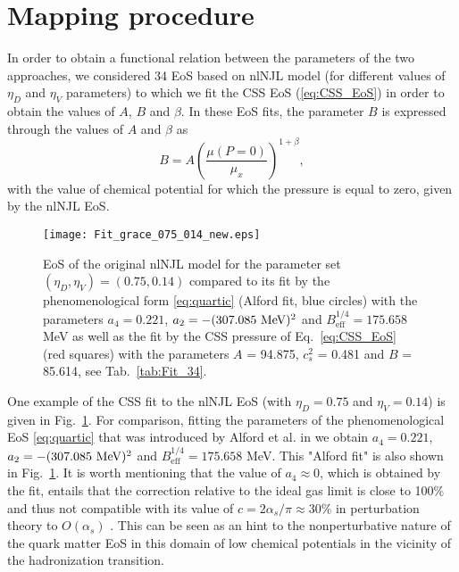 \documentclass[%
 reprint,
superscriptaddress,
nofootinbib,
 amsmath,amssymb,
 aps,
]{revtex4-1}
\begin{document}
\appendix
\section{Mapping procedure}
\label{app:CSS-map}

In order to obtain a functional relation between the parameters of the two approaches, we considered 34 EoS based on nlNJL model (for different values of $\eta_D$ and $\eta_V$ parameters) to which we fit the CSS EoS (\ref{eq:CSS_EoS}) in order to obtain the values of $A$, $B$ and $\beta$. In these EoS fits, the parameter $B$ is expressed through the values of $A$ and $\beta$ as  
\begin{equation}
    B = A \left( \frac{\mu(P=0)}{\mu_x}\right)^{1+\beta},
\end{equation}
with the value of chemical potential for which the pressure is equal to zero, given by the nlNJL EoS.

\begin{figure}[b!]
    \centering
    \texttt{[image: Fit\_grace\_075\_014\_new.eps]}
    \caption{EoS of the original nlNJL model for the parameter set $(\eta_D,\eta_V)=(0.75,0.14)$ compared to its fit by the phenomenological form \eqref{eq:quartic} (Alford fit, blue circles) with the parameters $a_4=0.221$, $a_2=-(307.085~\textmd{MeV})^2$ and $B_{\textrm{eff}}^{1/4}=175.658$ MeV %
    as well as the fit by the CSS pressure of Eq.~\eqref{eq:CSS_EoS} (red squares)
with the parameters $A$ = 94.875, $c_s^2$ = 0.481 and $B$ = 85.614, see Tab.~\ref{tab:Fit_34}. }
    \label{fig:gracefit}
\end{figure}

One example of the CSS fit to the nlNJL EoS (with $\eta_D=0.75$ and $\eta_V=0.14$) is given in Fig.~\ref{fig:gracefit}. For comparison, fitting the parameters of the phenomenological EoS \eqref{eq:quartic} that was introduced by Alford et al. in \cite{Alford:2004pf} we obtain $a_4=0.221$, $a_2=-(307.085~\textmd{MeV})^2$ and $B_{\textrm{eff}}^{1/4}=175.658$ MeV. This "Alford fit" is also shown in Fig.~\ref{fig:gracefit}. 
%
It is worth mentioning that the value of $a_4\approx 0$, which is obtained by the fit, entails that the correction relative to the ideal gas limit is close to 100\% and thus not compatible with its value of $c=2\alpha_s/\pi\approx 30\%$ in perturbation theory to $O(\alpha_s)$ \cite{Fraga:2001id}. This can be seen as an hint to the nonperturbative nature of the quark matter EoS in this domain of low chemical potentials in the vicinity of the hadronization transition. 
\end{document}
